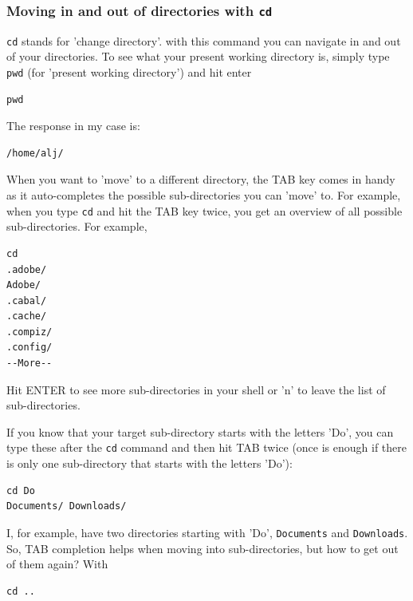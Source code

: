 \documentclass[11pt]{article}
\begin{document}
\subsubsection{Moving in and out of directories with \texttt{cd}}
\label{sec-2-1-2}
\texttt{cd} stands for 'change directory'. with this command you can navigate
in and out of your directories. To see what your present working
directory is, simply type \texttt{pwd} (for 'present working directory') and
hit enter

\begin{verbatim}
pwd
\end{verbatim}

The response in my case is:

\begin{verbatim}
/home/alj/
\end{verbatim}

When you want to 'move' to a different directory, the TAB key comes in
handy as it auto-completes the possible sub-directories you can 'move'
to. For example, when you type \texttt{cd} and hit the TAB key twice, you get an
overview of all possible sub-directories. For example,

\begin{verbatim}
cd 
.adobe/
Adobe/
.cabal/
.cache/
.compiz/
.config/
--More--
\end{verbatim}

Hit ENTER to see more sub-directories in your shell or 'n' to leave the
list of sub-directories.

If you know that your target sub-directory starts with the letters
'Do', you can type these after the \texttt{cd} command and then hit TAB twice
(once is enough if there is only one sub-directory that starts with the
letters 'Do'):

\begin{verbatim}
cd Do
Documents/ Downloads/
\end{verbatim}

I, for example, have two directories starting with 'Do', \texttt{Documents}
and \texttt{Downloads}. So, TAB completion helps when moving into
sub-directories, but how to get out of them again? With

\begin{verbatim}
cd ..
\end{verbatim}
\end{document}
